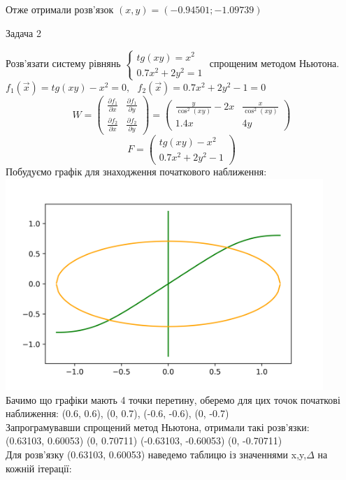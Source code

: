 \documentclass[14 pt]{extarticle}
\begin{document}
Отже отримали розв'язок $(x,y) = (-0.94501;-1.09739)$ 
 \newpage 
 \begin{center}
    \Large
    Задача 2
\end{center}
Розв'язати систему рівнянь $
\begin{cases}
tg(xy) = x^2 \\
0.7x^2 + 2y^2 = 1
\end{cases}
$ спрощеним методом Ньютона. 
$f_1 (\vec{x}) = tg(xy) - x^2 = 0, \ \ \ f_2 (\vec{x}) = 0.7x^2+2y^2-1=0$ 
$$
W = \begin{pmatrix}
    \frac{\partial f_1}{\partial x} & \frac{\partial f_1}{\partial y} \\ 
    \frac{\partial f_2}{\partial x} & \frac{\partial f_2}{\partial y}
\end{pmatrix} = 
\begin{pmatrix}
    \frac{y}{\cos^2(xy)} - 2x & \frac{x}{\cos^2(xy)} \\ 
    1.4x & 4y 
\end{pmatrix}
$$
$$
F = \begin{pmatrix}
    tg(xy) - x^2 \\ 
    0.7x^2+2y^2-1
\end{pmatrix}
$$
Побудуємо графік для знаходження початкового наближення: \\ 
\includegraphics[width=12cm]{plot2.png} \\ 
Бачимо що графіки мають 4 точки перетину, оберемо для цих точок початкові наближення: 
(0.6, 0.6), (0, 0.7), (-0.6, -0.6), (0, -0.7) \\ 
Запрограмувавши спрощений метод Ньютона, отримали такі розв'язки: \\ 
(0.63103, 0.60053) (0, 0.70711) (-0.63103, -0.60053) (0, -0.70711)\\
Для розв'язку (0.63103, 0.60053) наведемо таблицю із значеннями x,y,$\Delta$ на кожній ітерації: \\ 
\end{document}
